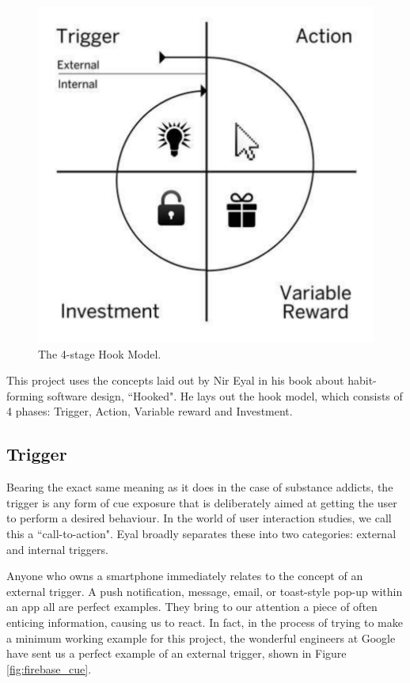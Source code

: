 \begin{figure}[h]
    \begin{center}
        \includegraphics[scale=0.3]{images/hook_model.png}
    \end{center}
    \caption{The 4-stage Hook Model.}
    \label{hook_model}
\end{figure}

This project uses the concepts laid out by Nir Eyal \cite{eyal2014hooked} in his book about habit-forming software design, ``Hooked". He lays out the hook model, which consists of 4 phases: Trigger, Action, Variable reward and Investment.

\subsection{Trigger}
Bearing the exact same meaning as it does in the case of substance addicts, the trigger is any form of cue exposure that is deliberately aimed at getting the user to perform a desired behaviour. In the world of user interaction studies, we call this a ``call-to-action".  Eyal \cite{eyal2014hooked} broadly separates these into two categories: external and internal triggers.

Anyone who owns a smartphone immediately relates to the concept of an external trigger. A push notification, message, email, or toast-style pop-up within an app all are perfect examples. They bring to our attention a piece of often enticing information, causing us to react. In fact, in the process of trying to make a minimum working example for this project, the wonderful engineers at Google have sent us a perfect example of an external trigger, shown in Figure \ref{fig:firebase_cue}.

